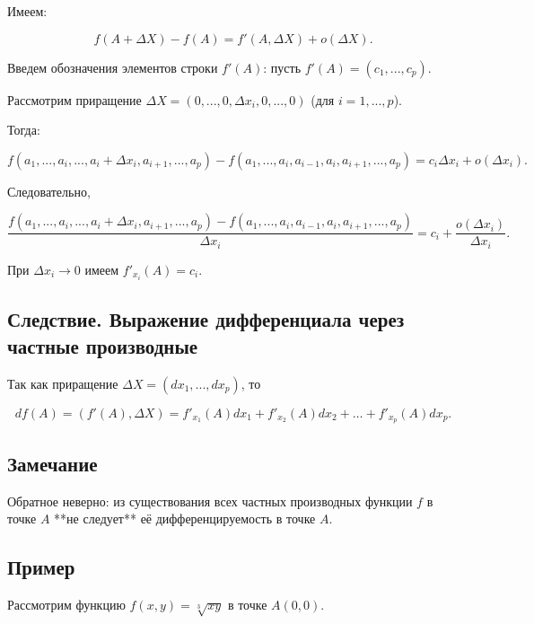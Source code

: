 {Имеем:



\[
f(A + \Delta X) - f(A) = f'(A, \Delta X) + o(\Delta X).
\]



Введем обозначения элементов строки \( f'(A) \): пусть \( f'(A) = (c_1, ..., c_p) \).

Рассмотрим приращение \( \Delta X = (0, ..., 0, \Delta x_i, 0, ..., 0) \) (для \( i = 1, ..., p \)).

Тогда:



\[
f(a_1, ..., a_i, ..., a_i + \Delta x_i, a_{i+1}, ..., a_p) - f(a_1, ..., a_i, a_{i-1}, a_i, a_{i+1}, ..., a_p) = c_i \Delta x_i + o(\Delta x_i).
\]



Следовательно,



\[
\frac{f(a_1, ..., a_i, ..., a_i + \Delta x_i, a_{i+1}, ..., a_p) - f(a_1, ..., a_i, a_{i-1}, a_i, a_{i+1}, ..., a_p)}{\Delta x_i} = c_i + \frac{o(\Delta x_i)}{\Delta x_i}.
\]



При \( \Delta x_i \to 0 \) имеем \( f'_{x_i}(A) = c_i \).

\subsection*{Следствие. Выражение дифференциала через частные производные}

Так как приращение \( \Delta X = (dx_1, ..., dx_p) \), то



\[
df(A) = (f'(A), \Delta X) = f'_{x_1}(A) dx_1 + f'_{x_2}(A) dx_2 + \dots + f'_{x_p}(A) dx_p.
\]



\subsection*{Замечание}

Обратное неверно: из существования всех частных производных функции \( f \) в точке \( A \) **не следует** её дифференцируемость в точке \( A \).


\subsection*{Пример}

Рассмотрим функцию \( f(x, y) = \sqrt[3]{xy} \) в точке \( A(0, 0) \).

}
